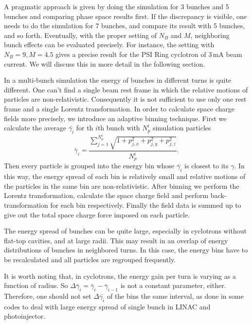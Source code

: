 \documentclass[aps,prstab,twocolumn,superscriptaddress]{revtex4}
\begin{document}
A pragmatic approach is given by doing the simulation for 3 bunches and 5 bunches and comparing phase space results first. If the discrepancy is visible, one needs to do 
the simulation for 7 bunches, and compare its result with 5 bunches, and so forth. 
Eventually, with the proper setting of $N_B$ and $M$, neighboring bunch effects can be evaluated precisely.
For instance, the setting with $N_B=9, M=4.5$ gives a precise result for the PSI Ring cyclotron of 3\,mA beam current.
We will discuss this in more detail in the following section. 

In a multi-bunch simulation the energy of bunches in different turns is quite different. One can't find a single beam rest frame in which the relative motions of 
particles are non-relativistic. Consequently it is not sufficient to use only one rest frame 
and a single Lorentz transformation. In order to calculate space charge fields more precisely, we introduce an adaptive binning technique.
First we calculate the average $\bar{\gamma_i}$ for th $i$th bunch with $N_p^i$ simulation particles
\begin{equation}\label{eq:dR1}
  \bar{\gamma}_i = \frac{\sum_{j=1}^{N_p^i}\sqrt{1+p_{j,x}^2+p_{j,y}^2+p_{j,z}^2}}{N_p^i}.
\end{equation}
Then every particle is grouped into the energy bin whose $\bar{\gamma_i}$ is closest to its $\gamma$. In this way, the energy spread of each bin is relatively small and relative motions of the particles in the same bin are non-relativistic.
After binning we perform the Lorentz transformation, calculate the space charge field and perform back-transformation for each bin respectively. 
Finally the field data is summed up to give out the total space charge force imposed on each particle.

The energy spread of bunches can be quite large, especially in cyclotrons without flat-top cavities, and at large radii. This may result in an overlap of 
energy distributions of bunches in neighbored turns. In this case, the energy bins have to be recalculated and all particles are regrouped frequently.

It is worth noting that, in cyclotrons, the energy gain per turn is varying as a function of radius. 
So $\Delta\bar{\gamma}_i= \bar{\gamma}_i-\bar{\gamma}_{i-1}$ is not a constant parameter, either. Therefore, one should not set $\Delta\bar{\gamma_i}$ of the bins 
the same interval, as done in some codes to deal with large energy spread of single bunch in LINAC and photoinjector.
\end{document}
